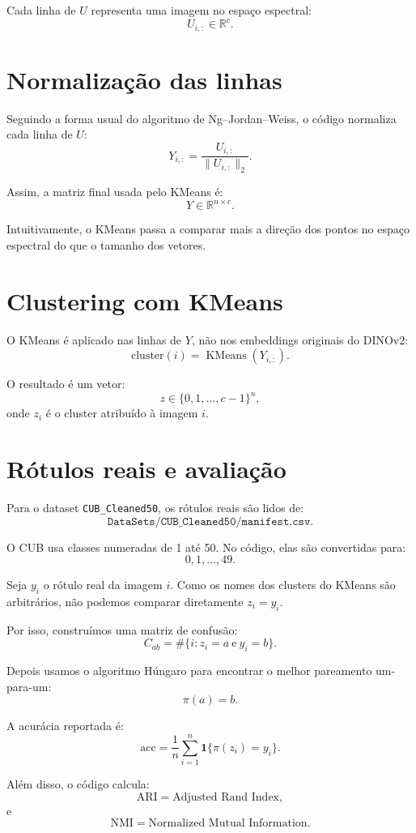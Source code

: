 \documentclass[11pt,a4paper]{article}
\begin{document}
Cada linha de \(U\) representa uma imagem no espaço espectral:
\[
U_{i,:} \in \mathbb{R}^{c}.
\]

\section{Normalização das linhas}

Seguindo a forma usual do algoritmo de Ng--Jordan--Weiss, o código normaliza
cada linha de \(U\):
\[
Y_{i,:} = \frac{U_{i,:}}{\|U_{i,:}\|_2}.
\]

Assim, a matriz final usada pelo KMeans é:
\[
Y \in \mathbb{R}^{n\times c}.
\]

Intuitivamente, o KMeans passa a comparar mais a direção dos pontos no espaço
espectral do que o tamanho dos vetores.

\section{Clustering com KMeans}

O KMeans é aplicado nas linhas de \(Y\), não nos embeddings originais do DINOv2:
\[
\text{cluster}(i) = \operatorname{KMeans}(Y_{i,:}).
\]

O resultado é um vetor:
\[
z \in \{0,1,\ldots,c-1\}^{n},
\]
onde \(z_i\) é o cluster atribuído à imagem \(i\).

\section{Rótulos reais e avaliação}

Para o dataset \texttt{CUB\_Cleaned50}, os rótulos reais são lidos de:
\[
\texttt{DataSets/CUB\_Cleaned50/manifest.csv}.
\]

O CUB usa classes numeradas de 1 até 50. No código, elas são convertidas para:
\[
0,1,\ldots,49.
\]

Seja \(y_i\) o rótulo real da imagem \(i\). Como os nomes dos clusters do
KMeans são arbitrários, não podemos comparar diretamente \(z_i=y_i\).

Por isso, construímos uma matriz de confusão:
\[
C_{ab} = \#\{i : z_i=a \ \text{e} \ y_i=b\}.
\]

Depois usamos o algoritmo Húngaro para encontrar o melhor pareamento um-para-um:
\[
\pi(a)=b.
\]

A acurácia reportada é:
\[
\text{acc} =
\frac{1}{n}
\sum_{i=1}^{n}
\mathbf{1}\{\pi(z_i)=y_i\}.
\]

Além disso, o código calcula:
\[
\text{ARI} = \text{Adjusted Rand Index},
\]
e
\[
\text{NMI} = \text{Normalized Mutual Information}.
\]
\end{document}
